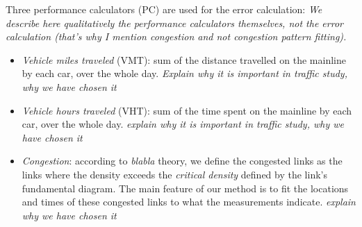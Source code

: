 Three performance calculators (PC) are used for the error calculation:
\color{red}\emph{We describe here qualitatively the performance calculators themselves, not the error calculation (that's why I mention congestion and not congestion pattern fitting).}\color{black}
\begin{itemize}
	\item \emph{Vehicle miles traveled} (VMT): sum of the distance travelled on the mainline by each car, over the whole day. \emph{Explain why it is important in traffic study, why we have chosen it} 
	\item \emph{Vehicle hours traveled} (VHT): sum of the time spent on the mainline by each car, over the whole day. \emph{explain why it is important in traffic study, why we have chosen it} 
	\item \emph{Congestion}: according to \emph{blabla} theory, we define the congested links as the links where the density exceeds the \emph{critical density} defined by the link's fundamental diagram. The main feature of our method is to fit the locations and times of these congested links to what the measurements indicate.
\emph{explain why we have chosen it}
\end{itemize}
